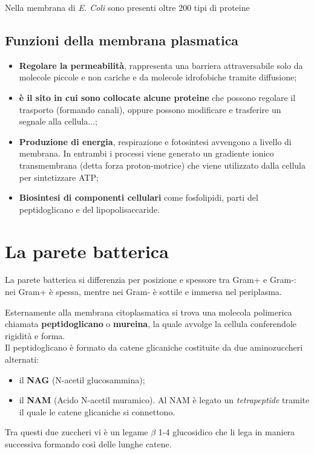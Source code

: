 \documentclass[11pt]{book}
\begin{document}
Nella membrana di \emph{E. Coli} sono presenti oltre 200 tipi di proteine

\subsection{Funzioni della membrana plasmatica}
\begin{itemize}
\item \textbf{Regolare la permeabilità}, rappresenta una barriera attraversabile solo da molecole piccole e non cariche e da molecole idrofobiche tramite diffusione;
\item \textbf{è il sito in cui sono collocate alcune proteine} che possono regolare il trasporto (formando canali), oppure possono modificare e trasferire un segnale alla cellula...;
\item \textbf{Produzione di energia}, respirazione e fotosintesi avvengono a livello di membrana. In entrambi i processi viene generato un gradiente ionico transmembrana (detta forza proton-motrice) che viene utilizzato dalla cellula per sintetizzare ATP;
\item \textbf{Biosintesi di componenti cellulari} come fosfolipidi, parti del peptidoglicano e del lipopolisaccaride.
\end{itemize}

\section{La parete batterica}

La parete batterica si differenzia per posizione e spessore tra Gram+ e Gram-: nei Gram+ è spessa, mentre nei Gram- è sottile e immersa nel periplasma.

Esternamente alla membrana citoplasmatica si trova una molecola polimerica chiamata \textbf{peptidoglicano} o \textbf{mureina}, la quale avvolge la cellula conferendole rigidità e forma.\\
Il peptidoglicano è formato da catene glicaniche costituite da due aminozuccheri alternati:
\begin{itemize}
\item il \textbf{NAG} (N-acetil glucosammina);
\item il \textbf{NAM} (Acido N-acetil muramico). Al NAM è legato un \emph{tetrapeptide} tramite il quale le catene glicaniche si connettono.
\end{itemize}

Tra questi due zuccheri vi è un legame $\beta$ 1-4 glucosidico che li lega in maniera successiva formando così delle lunghe catene.
\end{document}
